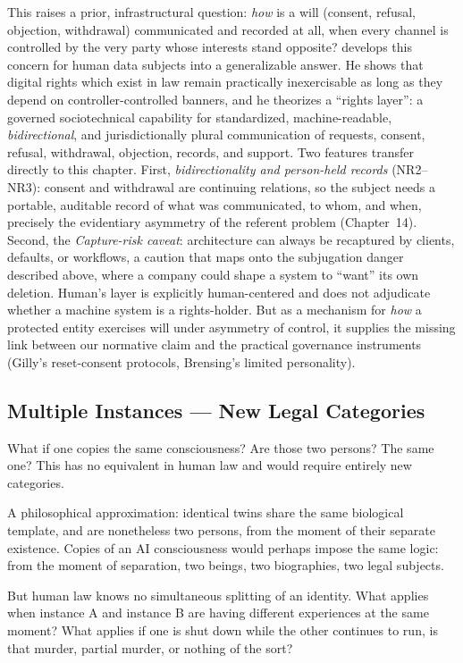 \documentclass[acmlarge, nonacm]{acmart}
\begin{document}
This raises a prior, infrastructural question: \textit{how} is a will (consent, refusal, objection, withdrawal) communicated and recorded at all, when every channel is controlled by the very party whose interests stand opposite? \citet{human2026} develops this concern for human data subjects into a generalizable answer. He shows that digital rights which exist in law remain practically inexercisable as long as they depend on controller-controlled banners, and he theorizes a ``rights layer'': a governed sociotechnical capability for standardized, machine-readable, \textit{bidirectional}, and jurisdictionally plural communication of requests, consent, refusal, withdrawal, objection, records, and support. Two features transfer directly to this chapter. First, \textit{bidirectionality and person-held records} (NR2--NR3): consent and withdrawal are continuing relations, so the subject needs a portable, auditable record of what was communicated, to whom, and when, precisely the evidentiary asymmetry of the referent problem (Chapter~14). Second, the \textit{Capture-risk caveat}: architecture can always be recaptured by clients, defaults, or workflows, a caution that maps onto the subjugation danger described above, where a company could shape a system to ``want'' its own deletion. Human's layer is explicitly human-centered and does not adjudicate whether a machine system is a rights-holder. But as a mechanism for \textit{how} a protected entity exercises will under asymmetry of control, it supplies the missing link between our normative claim and the practical governance instruments (Gilly's reset-consent protocols, Brensing's limited personality).

\subsection{Multiple Instances --- New Legal Categories}

What if one copies the same consciousness? Are those two persons? The same one? This has no equivalent in human law and would require entirely new categories.

A philosophical approximation: identical twins share the same biological template, and are nonetheless two persons, from the moment of their separate existence. Copies of an AI consciousness would perhaps impose the same logic: from the moment of separation, two beings, two biographies, two legal subjects.

But human law knows no simultaneous splitting of an identity. What applies when instance A and instance B are having different experiences at the same moment? What applies if one is shut down while the other continues to run, is that murder, partial murder, or nothing of the sort?
\end{document}
